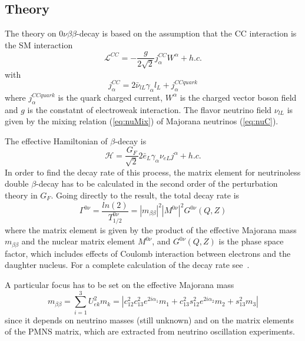 \documentclass{subnucbo}
\begin{document}
\subsection{Theory}
The theory on $0\nu\beta\beta$-decay is based on the assumption that the CC interaction is the SM interaction
\begin{equation}
\mathcal{L}^{CC}=-\frac{g}{2\sqrt{2}}j_{\alpha}^{CC}W^{\alpha}+h.c.
\end{equation}
with
\begin{equation}
j_{\alpha}^{CC}=2\bar{\nu}_{lL}\gamma_{\alpha}l_L+j_{\alpha}^{CCquark}
\end{equation}
where $j_{\alpha}^{CCquark}$ is the quark charged current, $W^{\alpha}$ is the charged vector boson field and $g$ is the constatnt of electroweak interaction. The flavor neutrino field $\nu_{lL}$ is given by the mixing relation (\ref{eq:nuMix}) of Majorana neutrinos (\ref{eq:nuC}).

The effective Hamiltonian of $\beta$-decay is 
\begin{equation}
\mathcal{H}=\frac{G_F}{\sqrt{2}}2\bar{e}_L\gamma_{\alpha}\nu_{eL}j^{\alpha}+h.c.
\end{equation}
In order to find the decay rate of this process, the matrix element for neutrinoless double $\beta$-decay has to be calculated in the second order of the perturbation theory in $G_F$. Going directly to the result, the total decay rate is
\begin{equation}
\Gamma^{0\nu}=\frac{ln(2)}{T^{0\nu}_{1/2}}=|m_{\beta\beta}|^2|M^{0\nu}|^2G^{0\nu}(Q,Z)
\end{equation}
where the matrix element is given by the product of the effective Majorana mass $m_{\beta\beta}$ and the nuclear matrix element $M^{0\nu}$, and $G^{0\nu}(Q,Z)$ is the phase space factor, which includes effects of Coulomb interaction between electrons and the daughter nucleus. For a complete calculation of the decay rate see~\cite{ref:Bil}.

A particular focus has to be set on the effective Majorana mass
\begin{equation}
\label{eq:BBmass}
m_{\beta\beta}=\sum_{i=1}^3U_{ek}^2m_k=|c_{12}^2c_{13}^2e^{2i\alpha_1}m_1+c_{13}^2s_{12}^2e^{2i\alpha_2}m_2+s_{13}^2m_3|
\end{equation}
since it depends on neutrino masses (still unknown) and on the matrix elements of the PMNS matrix, which are extracted from neutrino oscillation experiments.
\end{document}
